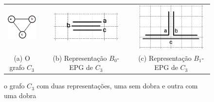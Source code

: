 \begin{figure}[h]
  \centering
  \begin{tabular}{ c p{0.15cm} c p{0.15cm} c }
    \includegraphics[width=2.3cm]{./img/trianguloabc.png} && \includegraphics[width=3.5cm]{./img/b0epgTransparenciaGrade2.png} & &
    \includegraphics[width=3.5cm]{./img/b1EpgTransparenteGrade2.png}
    \\
    \footnotesize %
    (a) O grafo $C_3$ && \footnotesize(b) Representação $B_0$-EPG de $C_3$ && \footnotesize (c) Representação $B_1$-EPG de $C_3$\\

  \end{tabular}

 \caption{o grafo $ C_3 $ com duas representações, uma sem dobra e outra com uma dobra} \label{fig:trianguloepgRepresentacao}
\end{figure}